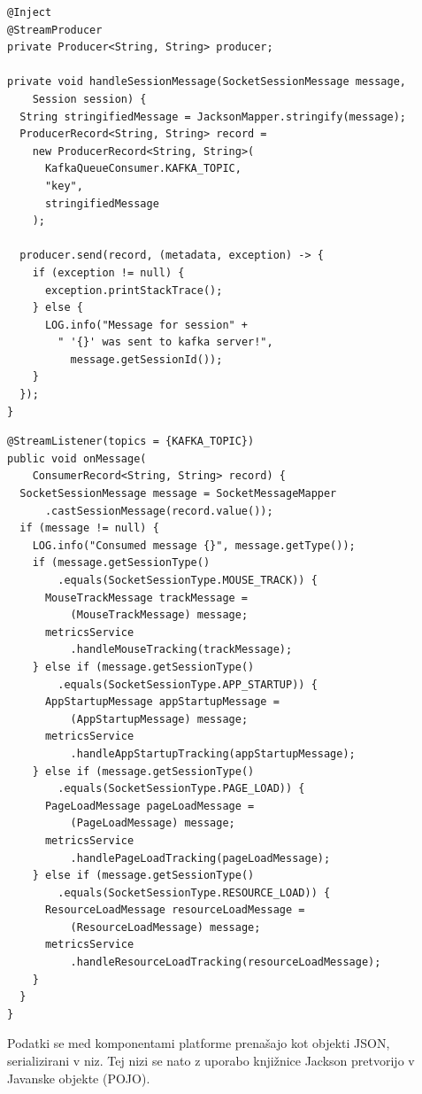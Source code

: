 \documentclass[a4paper, 12pt]{book}
\begin{document}
\begin{lstlisting}[label=code:service_kafka_producer, caption=Objavljanje sporočila v Kafko]
@Inject
@StreamProducer
private Producer<String, String> producer;

private void handleSessionMessage(SocketSessionMessage message,
    Session session) {
  String stringifiedMessage = JacksonMapper.stringify(message);
  ProducerRecord<String, String> record = 
    new ProducerRecord<String, String>(
      KafkaQueueConsumer.KAFKA_TOPIC,
      "key",
      stringifiedMessage
    );

  producer.send(record, (metadata, exception) -> {
    if (exception != null) {
      exception.printStackTrace();
    } else {
      LOG.info("Message for session" +
        " '{}' was sent to kafka server!",
          message.getSessionId());
    }
  });
}
\end{lstlisting}

\begin{lstlisting}[label=code:service_kafka_consumer, caption=Naročanje na sporočila v Kafki]
@StreamListener(topics = {KAFKA_TOPIC})
public void onMessage(
    ConsumerRecord<String, String> record) {
  SocketSessionMessage message = SocketMessageMapper
      .castSessionMessage(record.value());
  if (message != null) {
    LOG.info("Consumed message {}", message.getType());
    if (message.getSessionType()
        .equals(SocketSessionType.MOUSE_TRACK)) {
      MouseTrackMessage trackMessage = 
          (MouseTrackMessage) message;
      metricsService
          .handleMouseTracking(trackMessage);
    } else if (message.getSessionType()
        .equals(SocketSessionType.APP_STARTUP)) {
      AppStartupMessage appStartupMessage =
          (AppStartupMessage) message;
      metricsService
          .handleAppStartupTracking(appStartupMessage);
    } else if (message.getSessionType()
        .equals(SocketSessionType.PAGE_LOAD)) {
      PageLoadMessage pageLoadMessage =
          (PageLoadMessage) message;
      metricsService
          .handlePageLoadTracking(pageLoadMessage);
    } else if (message.getSessionType()
        .equals(SocketSessionType.RESOURCE_LOAD)) {
      ResourceLoadMessage resourceLoadMessage =
          (ResourceLoadMessage) message;
      metricsService
          .handleResourceLoadTracking(resourceLoadMessage);
    }
  }
}
\end{lstlisting}

Podatki se med komponentami platforme prenašajo kot objekti JSON, serializirani v niz. Tej nizi se nato z uporabo knjižnice Jackson pretvorijo v Javanske objekte (POJO).
\end{document}
